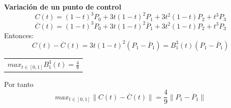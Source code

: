 \documentclass[twoside]{report}
\newcommand{\colocapdf}[2]{\quad\pdfimage width #2 {pdfs/#1.pdf}}
\begin{document}
%
%
%
%
%
%
%
{\bf Variación de un punto de control}
$$C(t)=(1-t)^3P_0+3t(1-t)^2P_1+3t^2(1-t)P_2+t^3P_3$$
$$\overline{C}(t)=(1-t)^3P_0+3t(1-t)^2\overline{P}_1+3t^2(1-t)P_2+t^3P_3$$
Entonces:
$$C(t)-\overline{C}(t)=3t(1-t)^2(P_1-\overline{P}_1)=B_1^3(t)(P_1-\overline{P}_1)$$
\begin{center}
\begin{minipage}{0.55\textwidth}
\begin{tabular}{c} $max_{t\in[0,1]}B_1^3(t)=\frac{4}{9}$
\end{tabular}
\end{minipage}
\end{center}
Por tanto
$$max_{t\in[0,1]}\parallel C(t)-\overline{C}(t)\parallel
=\frac{4}{9}\parallel P_1-\overline{P}_1\parallel$$
\end{document}
